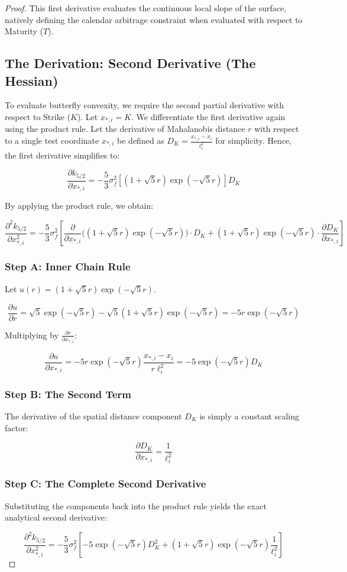 \documentclass[12pt,oneside]{report}
\theoremstyle{definition}
\theoremstyle{remark}
\begin{document}
\begin{proof}
This first derivative evaluates the continuous local slope of the surface, natively defining the calendar arbitrage constraint when evaluated with respect to Maturity ($T$).

\subsection{The Derivation: Second Derivative (The Hessian)}
To evaluate butterfly convexity, we require the second partial derivative with respect to Strike ($K$). Let $x_{*, i} = K$. We differentiate the first derivative again using the product rule. Let the derivative of Mahalanobis distance $r$ with respect to a single test coordinate $x_{*, i}$ be defined as $D_K = \frac{x_{*, i} - x_i}{\ell_i^2}$ for simplicity. Hence, the first derivative simplifies to:

$$\frac{\partial k_{5/2}}{\partial x_{*, i}} = -\frac{5}{3} \sigma_f^2 \left[ (1 + \sqrt{5}r) \exp(-\sqrt{5}r) \right] D_K$$

By applying the product rule, we obtain:
 
$$\frac{\partial^2 k_{5/2}}{\partial x_{*, i}^2} = -\frac{5}{3} \sigma_f^2 \left[ \frac{\partial}{\partial x_{*, i}} \Big( (1 + \sqrt{5}r) \exp(-\sqrt{5}r) \Big) \cdot D_K + (1 + \sqrt{5}r) \exp(-\sqrt{5}r) \cdot \frac{\partial D_K}{\partial x_{*, i}} \right]$$

\subsubsection{Step A: Inner Chain Rule}
Let $u(r) = (1 + \sqrt{5}r) \exp(-\sqrt{5}r)$.


$$\frac{\partial u}{\partial r} = \sqrt{5} \exp(-\sqrt{5}r) - \sqrt{5}(1+\sqrt{5}r)\exp(-\sqrt{5}r) = -5r \exp(-\sqrt{5}r)$$

Multiplying by $\frac{\partial r}{\partial x_{*, i}}$:

$$\frac{\partial u}{\partial x_{*, i}} = -5r \exp(-\sqrt{5}r) \frac{x_{*, i} - x_i}{r \ell_i^2} = -5 \exp(-\sqrt{5}r) D_K$$


\subsubsection{Step B: The Second Term}
The derivative of the spatial distance component $D_K$ is simply a constant scaling factor:


$$\frac{\partial D_K}{\partial x_{*, i}} = \frac{1}{\ell_i^2}$$



\subsubsection{Step C: The Complete Second Derivative}
Substituting the components back into the product rule yields the exact analytical second derivative:


$$\frac{\partial^2 k_{5/2}}{\partial x_{*, i}^2} = -\frac{5}{3} \sigma_f^2 \left[ -5 \exp(-\sqrt{5}r) D_K^2 + (1 + \sqrt{5}r) \exp(-\sqrt{5}r) \frac{1}{\ell_i^2} \right]$$

\end{proof}
\end{document}
